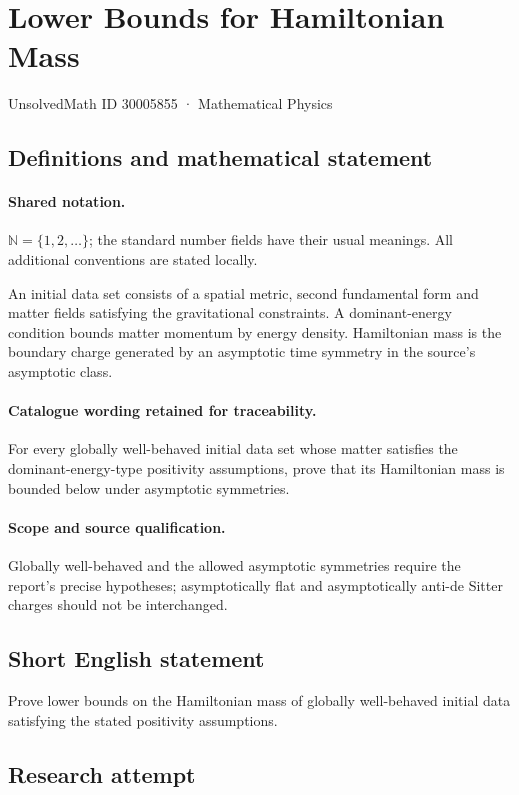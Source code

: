 \documentclass[11pt]{article}
\begin{document}
\setcounter{section}{30005854}
\section{Lower Bounds for Hamiltonian Mass}\label{30005855}
{\small UnsolvedMath ID 30005855 · Mathematical Physics}
\subsection{Definitions and mathematical statement}

\paragraph{Shared notation.}$\mathbb N=\{1,2,\ldots\}$; the standard number fields have their usual meanings. All additional conventions are stated locally.


An initial data set consists of a spatial metric, second fundamental form and matter fields satisfying the gravitational constraints. A dominant-energy condition bounds matter momentum by energy density. Hamiltonian mass is the boundary charge generated by an asymptotic time symmetry in the source's asymptotic class.

\paragraph{Catalogue wording retained for traceability.}
For every globally well-behaved initial data set whose matter satisfies the dominant-energy-type positivity assumptions, prove that its Hamiltonian mass is bounded below under asymptotic symmetries.

\paragraph{Scope and source qualification.}Globally well-behaved and the allowed asymptotic symmetries require the report's precise hypotheses; asymptotically flat and asymptotically anti-de Sitter charges should not be interchanged.
\subsection{Short English statement}
Prove lower bounds on the Hamiltonian mass of globally well-behaved initial data satisfying the stated positivity assumptions.
\subsection{Research attempt}
\end{document}
